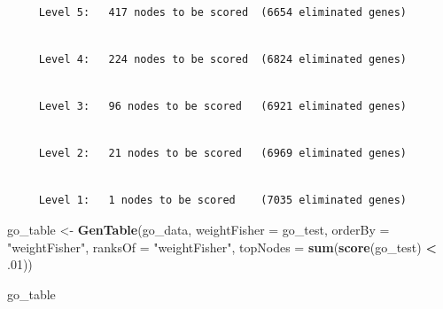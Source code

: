 \documentclass[]{article}
\newenvironment{Shaded}{\begin{snugshade}}{\end{snugshade}}
\newcommand{\KeywordTok}[1]{\textcolor[rgb]{0.13,0.29,0.53}{\textbf{#1}}}
\newcommand{\DataTypeTok}[1]{\textcolor[rgb]{0.13,0.29,0.53}{#1}}
\newcommand{\DecValTok}[1]{\textcolor[rgb]{0.00,0.00,0.81}{#1}}
\newcommand{\StringTok}[1]{\textcolor[rgb]{0.31,0.60,0.02}{#1}}
\newcommand{\OperatorTok}[1]{\textcolor[rgb]{0.81,0.36,0.00}{\textbf{#1}}}
\newcommand{\NormalTok}[1]{#1}
\begin{document}
\begin{verbatim}

     Level 5:   417 nodes to be scored  (6654 eliminated genes)
\end{verbatim}

\begin{verbatim}

     Level 4:   224 nodes to be scored  (6824 eliminated genes)
\end{verbatim}

\begin{verbatim}

     Level 3:   96 nodes to be scored   (6921 eliminated genes)
\end{verbatim}

\begin{verbatim}

     Level 2:   21 nodes to be scored   (6969 eliminated genes)
\end{verbatim}

\begin{verbatim}

     Level 1:   1 nodes to be scored    (7035 eliminated genes)
\end{verbatim}

\begin{Shaded}
\begin{Highlighting}[]
\NormalTok{go_table <-}\StringTok{ }\KeywordTok{GenTable}\NormalTok{(go_data, }\DataTypeTok{weightFisher =}\NormalTok{ go_test,}
                         \DataTypeTok{orderBy =} \StringTok{"weightFisher"}\NormalTok{, }\DataTypeTok{ranksOf =} \StringTok{"weightFisher"}\NormalTok{,}
                         \DataTypeTok{topNodes =} \KeywordTok{sum}\NormalTok{(}\KeywordTok{score}\NormalTok{(go_test) }\OperatorTok{<}\StringTok{ }\NormalTok{.}\DecValTok{01}\NormalTok{))}

\NormalTok{go_table}
\end{Highlighting}
\end{Shaded}
\end{document}
